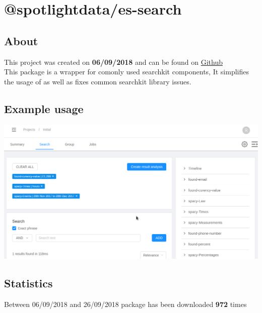 \documentclass{article}
\begin{document}
\section{@spotlightdata/es-search}

\subsection{About}
\begin{flushleft}
This project was created on \textbf{06/09/2018} and can be found on \href{https://github.com/SpotlightData/es-search}{Github} \\
This package is a wrapper for comonly used searchkit components, It simplifies the usage of as well as fixes common searchkit library issues.
\end{flushleft}

\subsection{Example usage}

\begin{center}
  \includegraphics[scale=0.5]{Screenshot_2018-09-28_11-43-45.png}
\end{center}

\pagebreak

\subsection{Statistics}

\begin{flushleft}
Between 06/09/2018 and 26/09/2018 package has been downloaded \textbf{972} times
\end{flushleft}
\end{document}
